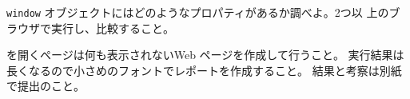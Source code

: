 \begin{Prob}\upshape\Must
\Verb+window+ オブジェクトにはどのようなプロパティがあるか調べよ。2つ以
 上のブラウザで実行し、比較すること。
\end{Prob}
\ifText
{}を開くページは何も表示されないWeb ページを作成して行うこと。
実行結果は長くなるので小さめのフォントでレポートを作成すること。
結果と考察は別紙で提出のこと。
\fi